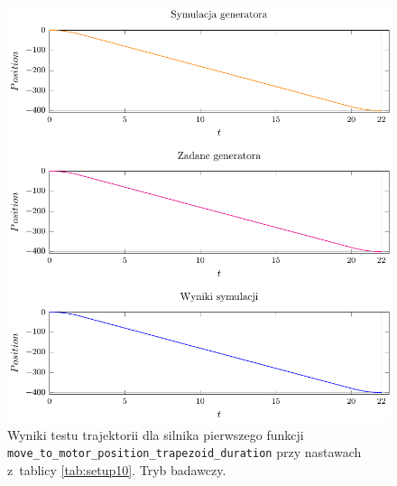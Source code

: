 \documentclass[a4paper, 12pt]{article}
\begin{document}
	\begin{figure}[H]
		\centering
		\includegraphics[scale=1.2]{raport_graphs/simpMPDRrevers.pdf}
		\caption{Wyniki testu trajektorii dla silnika pierwszego funkcji \texttt{move\_to\_motor\_position\_trapezoid\_duration} przy nastawach z~tablicy \ref{tab:setup10}. Tryb badawczy.}
		\label{fig:simpMPDRrevers}
	\end{figure}
		
\end{document}

